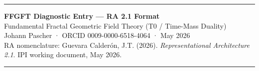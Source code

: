 \vspace{0.6em}\hrule\vspace{0.5em}

\begin{center}
{\large\bfseries FFGFT Diagnostic Entry — RA 2.1 Format}\\[0.2em]
{\normalsize Fundamental Fractal Geometric Field Theory (T0 / Time-Mass Duality)}\\[0.1em]
{\small Johann Pascher · ORCID 0009-0000-6518-4064 · May 2026}\\[0.1em]
{\footnotesize RA nomenclature: Guevara Calderón, J.T. (2026). \textit{Representational Architecture 2.1}. IPI working document, May 2026.}
\end{center}

\vspace{0.3em}\hrule\vspace{0.3em}

